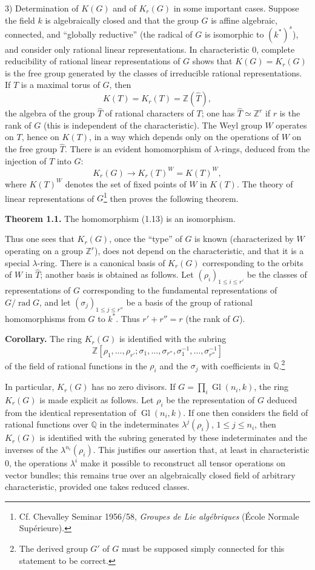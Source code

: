 \documentclass[11pt]{article}
\providecommand{\Z}{\mathbb Z}
\providecommand{\Q}{\mathbb Q}
\providecommand{\That}{\widehat T}
\providecommand{\rad}{\operatorname{rad}}
\providecommand{\Gl}{\operatorname{Gl}}
\begin{document}
3) Determination of $K(G)$ and of $K_r(G)$ in some important cases. Suppose the field $k$ is algebraically closed and that the group $G$ is affine algebraic, connected, and ``globally reductive'' (the radical of $G$ is isomorphic to $(k^*)^s$), and consider only rational linear representations. In characteristic $0$, complete reducibility of rational linear representations of $G$ shows that $K(G)=K_r(G)$ is the free group generated by the classes of irreducible rational representations. If $T$ is a maximal torus of $G$, then
\[
K(T)=K_r(T)=\Z(\That),
\]
the algebra of the group $\That$ of rational characters of $T$; one has $\That\simeq \Z^r$ if $r$ is the rank of $G$ (this is independent of the characteristic). The Weyl group $W$ operates on $T$, hence on $K(T)$, in a way which depends only on the operations of $W$ on the free group $\That$. There is an evident homomorphism of $\lambda$-rings, deduced from the injection of $T$ into $G$:
\begin{equation}\tag{1.13}
K_r(G)\longrightarrow K_r(T)^W=K(T)^W,
\end{equation}
where $K(T)^W$ denotes the set of fixed points of $W$ in $K(T)$. The theory of linear representations of $G$\footnote{Cf. Chevalley Seminar 1956/58, \emph{Groupes de Lie algébriques} (École Normale Supérieure).} then proves the following theorem.

\textbf{Theorem 1.1.} The homomorphism (1.13) is an isomorphism.

Thus one sees that $K_r(G)$, once the ``type'' of $G$ is known (characterized by $W$ operating on a group $\Z^r$), does not depend on the characteristic, and that it is a special $\lambda$-ring. There is a canonical basis of $K_r(G)$ corresponding to the orbits of $W$ in $\That$; another basis is obtained as follows. Let $(\rho_i)_{1\leq i\leq r'}$ be the classes of representations of $G$ corresponding to the fundamental representations of $G/\rad G$, and let $(\sigma_j)_{1\leq j\leq r''}$ be a basis of the group of rational homomorphisms from $G$ to $k^*$. Thus $r'+r''=r$ (the rank of $G$).

\textbf{Corollary.} The ring $K_r(G)$ is identified with the subring
\[
\Z[\rho_1,\ldots,\rho_{r'};\sigma_1,\ldots,\sigma_{r''},\sigma_1^{-1},\ldots,\sigma_{r''}^{-1}]
\]
of the field of rational functions in the $\rho_i$ and the $\sigma_j$ with coefficients in $\Q$.\footnote{The derived group $G'$ of $G$ must be supposed simply connected for this statement to be correct.}

In particular, $K_r(G)$ has no zero divisors. If $G=\prod_i\Gl(n_i,k)$, the ring $K_r(G)$ is made explicit as follows. Let $\rho_i$ be the representation of $G$ deduced from the identical representation of $\Gl(n_i,k)$. If one then considers the field of rational functions over $\Q$ in the indeterminates $\lambda^j(\rho_i)$, $1\leq j\leq n_i$, then $K_r(G)$ is identified with the subring generated by these indeterminates and the inverses of the $\lambda^{n_i}(\rho_i)$. This justifies our assertion that, at least in characteristic $0$, the operations $\lambda^i$ make it possible to reconstruct all tensor operations on vector bundles; this remains true over an algebraically closed field of arbitrary characteristic, provided one takes reduced classes.
\end{document}

